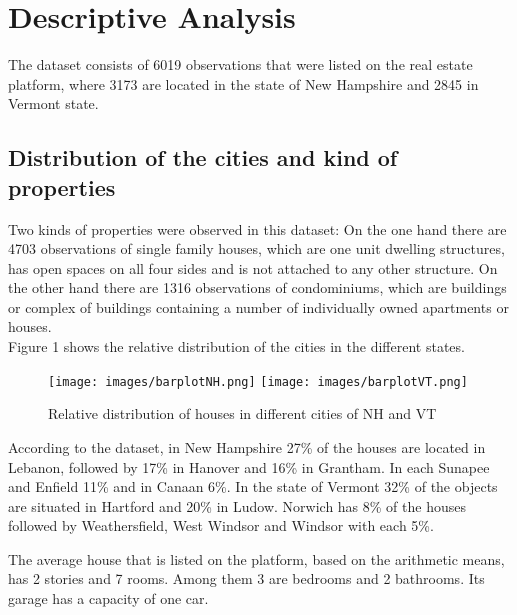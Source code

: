 \section{Descriptive Analysis}\label{Sec:Descriptive}

The dataset consists of 6019 observations that were listed on the real estate platform, where 3173 are located in the state of New Hampshire and 2845 in Vermont state.\\

\subsection{Distribution of the cities and kind of properties}
Two kinds of properties were observed in this dataset: On the one hand there are 4703 observations of single family houses, which are one unit dwelling structures, has open spaces on all four sides and is not attached to any other structure. On the other hand there are 1316 observations of condominiums, which are buildings or complex of buildings containing a number of individually owned apartments or houses.\\

Figure 1  shows the relative distribution of the cities in the different states. \\


\begin{figure}[ht]
\centering
	\texttt{[image: images/barplotNH.png]}
	\texttt{[image: images/barplotVT.png]}
  \caption{Relative distribution of houses in different cities of NH and VT}
\end{figure}


According to the dataset,  in New Hampshire 27\% of the houses are located in Lebanon, followed by 17\% in Hanover and 16\% in Grantham. In each Sunapee and Enfield 11\% and in Canaan 6\%.
In the state of Vermont 32\% of the objects are situated in Hartford and 20\% in Ludow. Norwich has 8\% of the houses followed by Weathersfield, West Windsor and Windsor with each 5\%.



The average house that is listed on the platform, based on the arithmetic means, has 2 stories and 7 rooms. Among them 3 are bedrooms and 2 bathrooms. Its garage has a capacity of one car.\\

